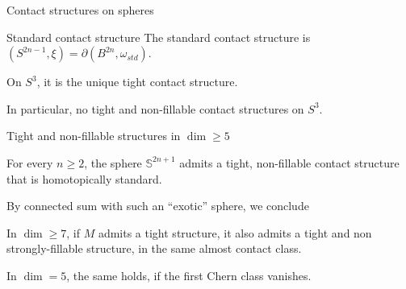 \documentclass{beamer}
\begin{document}
\begin{frame}{Contact structures on spheres}

\begin{exampleblock}{Standard contact structure}
The standard contact structure is $(S^{2n-1},\xi)=\partial(B^{2n},\omega_{std})$.
\end{exampleblock}

\pause

\begin{theorem}[Eliashberg, '91] 
    On $S^3$, it is the unique tight contact structure.
\end{theorem} 

In particular, no tight and non-fillable contact structures on $S^3$.

    
    
    
    


\end{frame}

\begin{frame}{Tight and non-fillable structures in $\dim \geq 5$}

\begin{theorem}
    For every $n \geq 2$, the sphere $\mathbb S^{2n+1}$ admits a tight, non-fillable contact structure that is homotopically standard.
\end{theorem}

\pause
\vspace*{1cm}
By connected sum with such an ``exotic'' sphere, we conclude
\begin{theorem}
In $\dim \geq 7$, if $M$ admits a tight structure, it also admits a tight and non strongly-fillable structure, in the same almost contact class.
\pause

In $\dim=5$, the same holds, if the first Chern class vanishes.
\end{theorem}
\end{frame}
\end{document}
